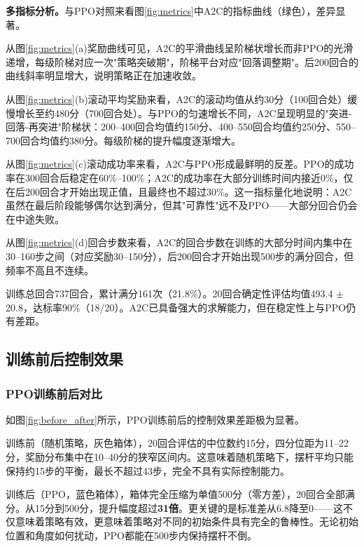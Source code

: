 \documentclass[12pt,a4paper]{ctexart}
\begin{document}
\textbf{多指标分析。}与PPO对照来看图\ref{fig:metrics}中A2C的指标曲线（绿色），差异显著。

从图\ref{fig:metrics}(a)奖励曲线可见，A2C的平滑曲线呈阶梯状增长而非PPO的光滑递增，每级阶梯对应一次"策略突破期"，阶梯平台对应"回落调整期"。后200回合的曲线斜率明显增大，说明策略正在加速收敛。

从图\ref{fig:metrics}(b)滚动平均奖励来看，A2C的滚动均值从约30分（100回合处）缓慢增长至约480分（700回合处）。与PPO的匀速增长不同，A2C呈现明显的"突进-回落-再突进"阶梯状：200--400回合均值约150分、400--550回合均值约250分、550--700回合均值约380分。每级阶梯的提升幅度逐渐增大。

从图\ref{fig:metrics}(c)滚动成功率来看，A2C与PPO形成最鲜明的反差。PPO的成功率在300回合后稳定在60\%--100\%；A2C的成功率在大部分训练时间内接近0\%，仅在后200回合才开始出现正值，且最终也不超过30\%。这一指标量化地说明：A2C虽然在最后阶段能够偶尔达到满分，但其"可靠性"远不及PPO——大部分回合仍会在中途失败。

从图\ref{fig:metrics}(d)回合步数来看，A2C的回合步数在训练的大部分时间内集中在30--160步之间（对应奖励30--150分），后200回合才开始出现500步的满分回合，但频率不高且不连续。

训练总回合737回合，累计满分161次（21.8\%）。20回合确定性评估均值493.4 $\pm$ 20.8，达标率90\%（18/20）。A2C已具备强大的求解能力，但在稳定性上与PPO仍有差距。

\subsection{训练前后控制效果}

\subsubsection{PPO训练前后对比}

如图\ref{fig:before_after}所示，PPO训练前后的控制效果差距极为显著。

训练前（随机策略，灰色箱体），20回合评估的中位数约15分，四分位距为11--22分，奖励分布集中在10--40分的狭窄区间内。这意味着随机策略下，摆杆平均只能保持约15步的平衡，最长不超过43步，完全不具有实际控制能力。

训练后（PPO，蓝色箱体），箱体完全压缩为单值500分（零方差），20回合全部满分。从15分到500分，提升幅度超过\textbf{31倍}。更关键的是标准差从6.8降至0——这不仅意味着策略有效，更意味着策略对不同的初始条件具有完全的鲁棒性。无论初始位置和角度如何扰动，PPO都能在500步内保持摆杆不倒。
\end{document}
